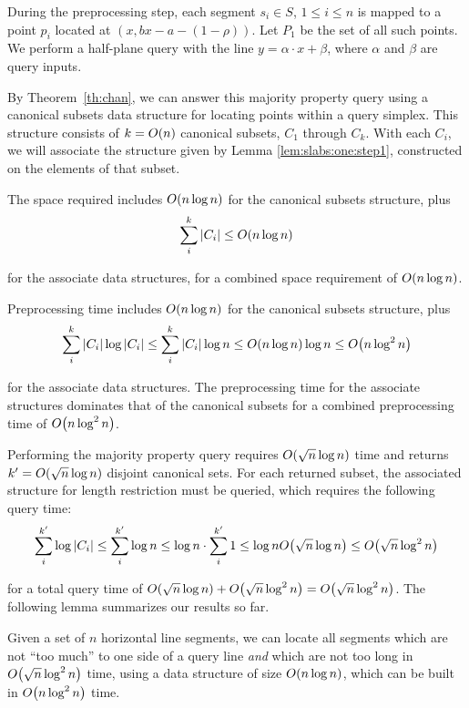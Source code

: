 During the preprocessing step, each segment $s_i \in S$, $1 \leq i \leq n$ is mapped to a point $p_i$ located at $(x, bx - a - (1 - \rho))$. Let $P_1$ be the set of all such points. We perform a half-plane query with the line $y = \alpha\cdot x + \beta$, where $\alpha$ and $\beta$ are query inputs.

By Theorem~\ref{th:chan}, we can answer this majority property query using a canonical subsets data structure for locating points within a query simplex. This structure consists of $k = O\!\left(n\right)$ canonical subsets, $C_1$ through $C_k$. With each $C_i$, we will associate the structure given by Lemma \ref{lem:slabs:one:step1}, constructed on the elements of that subset.

The space required includes $O\!\left(n \log{n}\right)$ for the canonical subsets structure, plus
\[
\sum_{i}^{k}{|C_i|} \leq O\!\left(n\log{n}\right)
\]

\noindent for the associate data structures, for a combined space requirement of $O\!\left(n\log{n}\right)$.

Preprocessing time includes $O\!\left(n\log{n}\right)$ for the canonical subsets structure, plus
\[
\sum_{i}^{k}{|C_i| \log{|C_i|}} 
\leq \sum_{i}^{k}{|C_i| \log{n}} 
\leq O\!\left(n\log{n}\right) \log{n} 
\leq O\!\left(n \log^2{n}\right)
\]

\noindent for the associate data structures. The preprocessing time for the associate structures dominates that of the canonical subsets for a combined preprocessing time of $O\!\left(n\log^2{n}\right)$.

Performing the majority property query requires $O\!\left(\sqrt{n}\log{n}\right)$ time and returns $k' = O\!\left(\sqrt{n}\log{n}\right)$ disjoint canonical sets. For each returned subset, the associated structure for length restriction must be queried, which requires the following query time:
\[
\sum_{i}^{k'}{\log{|C_i|}} 
\leq \sum_{i}^{k'}{\log{n}} 
\leq \log{n} \cdot \sum_{i}^{k'}{1}
\leq \log{n} O\!\left(\sqrt{n}\log{n}\right)
\leq O\!\left(\sqrt{n}\log^2{n}\right)
\]

\noindent
for a total query time of $O\!\left(\sqrt{n}\log{n}\right) + O\!\left(\sqrt{n}\log^2{n}\right) = O\!\left(\sqrt{n}\log^2{n}\right)$. The following lemma summarizes our results so far.

\begin{lemma}
\label{lem:slabs:one:step2}
Given a set of $n$ horizontal line segments, we can locate all segments which are not ``too much'' to one side of a query line \emph{and} which are not too long in $O\!\left(\sqrt{n}\log^2{n}\right)$ time, using a data structure of size $O\!\left(n\log{n}\right)$, which can be built in $O\!\left(n\log^2{n}\right)$ time.
\end{lemma}


